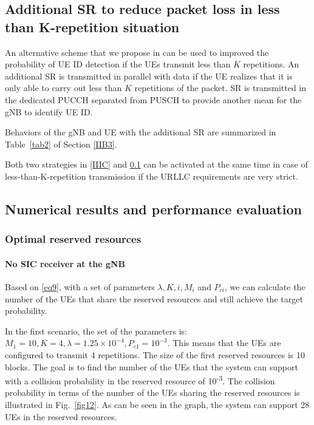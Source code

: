 \documentclass{ieeeaccess}
\begin{document}
\subsection{Additional SR to reduce packet loss in less than K-repetition situation}\label{IIID}

An alternative scheme that we propose in \cite{ad100} can be used to improved the probability of UE ID detection if the UEs transmit less than $K$ repetitions. An additional SR is transmitted in parallel with data if the UE realizes that it is only able to carry out less than $K$ repetitions of the packet. SR is transmitted in the dedicated PUCCH separated from PUSCH to provide another mean for the gNB to identify UE ID.

Behaviors of the gNB and UE with the additional SR are summarized in Table~\ref{tab2} of Section \ref{IIB3}. 

Both two strategies in \ref{IIIC} and \ref{IIID} can be activated at the same time in case of less-than-K-repetition transmission if the URLLC requirements are very strict.

\subsection{Numerical results and performance evaluation}\label{IV}

\subsubsection{Optimal reserved resources}
\paragraph{No SIC receiver at the gNB}\label{IVB1}
Based on \eqref{eq9}, with a set of parameters  $\lambda, K, i, M_{i}$ and $P_{ci}$, we can calculate the number of the UEs that share the reserved resources and still achieve the target probability.

In the first scenario, the set of the parameters is: $M_1=10, K=4, \lambda=1.25\times10^{-4}, P_{c1}=10^{-3}$. This means that the UEs are configured to transmit 4 repetitions. The size of the first reserved resources is 10 blocks. The goal is to find the number of the UEs that the system can support with a collision probability in the reserved resource of 10\textsuperscript{-3}. The collision probability in terms of the number of the UEs sharing the reserved resources is illustrated in Fig.~\ref{fig12}. As can be seen in the graph, the system can support 28 UEs in the reserved resources.
\end{document}
